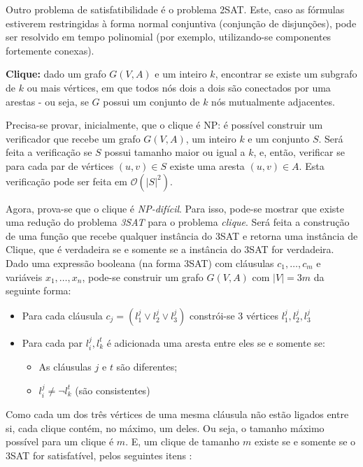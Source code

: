 Outro problema de satisfatibilidade é o problema 2SAT. Este, caso as fórmulas estiverem restringidas à forma normal conjuntiva (conjunção de disjunções), pode ser resolvido em tempo polinomial (por exemplo, utilizando-se componentes fortemente conexas).

\begin{trivlist}
\item \textbf{Clique:} dado um grafo $G(V, A)$ e um inteiro $k$, encontrar se existe um subgrafo de $k$ ou mais vértices, em que todos nós dois a dois são conectados por uma arestas - ou seja, se $G$ possui um conjunto de $k$ nós mutualmente adjacentes.
\end{trivlist}

Precisa-se provar, inicialmente, que o clique é NP: é possível construir um verificador que recebe um grafo $G(V, A)$, um inteiro $k$ e um conjunto $S$. Será feita a verificação se $S$ possui tamanho maior ou igual a $k$, e, então, verificar se para cada par de vértices $(u, v) \in S$ existe uma aresta $(u, v) \in A$. Esta verificação pode ser feita em $\mathcal{O}(|S|^2)$.

Agora, prova-se que o clique é \textit{NP-difícil}. Para isso, pode-se mostrar que existe uma redução do problema \textit{3SAT} para o problema \textit{clique}. Será feita a construção de uma função que recebe qualquer instância do 3SAT e retorna uma instância de Clique, que é verdadeira se e somente se a instância do 3SAT for verdadeira. Dado uma expressão booleana (na forma 3SAT) com cláusulas $c_1, \dots, c_m$ e variáveis $x_1, \dots, x_n$, pode-se construir um grafo $G(V, A)$ com $|V| = 3m$ da seguinte forma:

\begin{itemize}
    \item Para cada cláusula $c_j = (l_1^j \lor l_2^j \lor l_3^j)$ constrói-se 3 vértices $l_1^j, l_2^j, l_3^j$
    \item Para cada par $l_i^j, l_k^t$ é adicionada uma aresta entre eles se e somente se:
    \begin{itemize}
        \item As cláusulas $j$ e $t$ são diferentes;
        \item $l_i^j \neq \neg l_k^t$ (são consistentes)
    \end{itemize}
\end{itemize}

Como cada um dos três vértices de uma mesma cláusula não estão ligados entre si, cada clique contém, no máximo, um deles. Ou seja, o tamanho máximo possível para um clique é $m$. E, um clique de tamanho $m$ existe se e somente se o 3SAT for satisfatível, pelos seguintes itens \cite{peng2016}:

